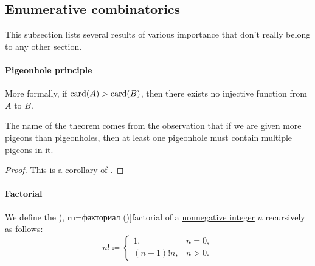 \subsection{Enumerative combinatorics}\label{subsec:enumerative_combinatorics}

This subsection lists several results of various importance that don't really belong to any other section.

\paragraph{Pigeonhole principle}

\begin{theorem}\label{thm:pigeonhole_principle}
  More formally, if \( \operatorname{card}(A) > \operatorname{card}(B) \), then there exists no injective function from \( A \) to \( B \).
\end{theorem}
\begin{comments}
  \item The name of the theorem comes from the observation that if we are given more pigeons than pigeonholes, then at least one pigeonhole must contain multiple pigeons in it.
\end{comments}
\begin{proof}
  This is a corollary of .
\end{proof}

\paragraph{Factorial}

\begin{definition}\label{def:factorial}
  We define the \term[bg=факториел (\cite[129]{Тагамлицки1971Диф}), ru=факториал (\cite[145]{ЭнциклопедияЕлементарнойМатематикиТом3})]{factorial} of a \hyperref[def:integer_signum]{nonnegative integer} \( n \) recursively as follows:
  \begin{equation*}
    n! \coloneqq \begin{cases}
      1,          &n = 0, \\
      (n - 1)! n, &n > 0.
    \end{cases}
  \end{equation*}
\end{definition}

